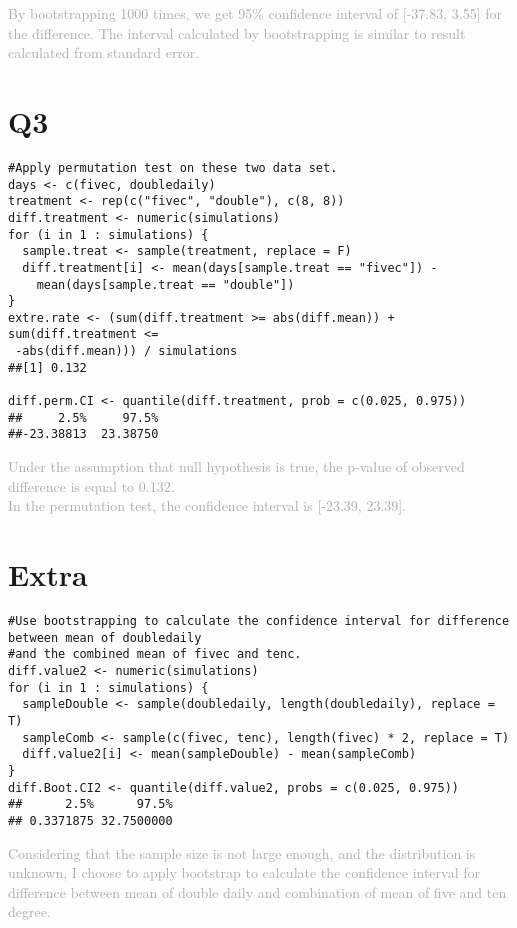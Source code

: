 \documentclass[12pt]{article}
\begin{document}
\noindent \textcolor{darkgray}{By bootstrapping 1000 times, we get 95$\%$ confidence interval of [-37.83, 3.55] for the difference. The interval calculated by bootstrapping is similar to result calculated from standard error.}

\section*{Q3}
\begin{verbatim}
#Apply permutation test on these two data set.
days <- c(fivec, doubledaily)
treatment <- rep(c("fivec", "double"), c(8, 8))
diff.treatment <- numeric(simulations) 
for (i in 1 : simulations) {
  sample.treat <- sample(treatment, replace = F)
  diff.treatment[i] <- mean(days[sample.treat == "fivec"]) - 
  	mean(days[sample.treat == "double"])
}
extre.rate <- (sum(diff.treatment >= abs(diff.mean)) + sum(diff.treatment <=
 -abs(diff.mean))) / simulations
##[1] 0.132

diff.perm.CI <- quantile(diff.treatment, prob = c(0.025, 0.975))
##     2.5%     97.5% 
##-23.38813  23.38750 
\end{verbatim}

\noindent \textcolor{darkgray}{Under the assumption that null hypothesis is true, the p-value of observed difference is equal to 0.132. \\
In the permutation test, the confidence interval is [-23.39, 23.39].}

\section*{Extra}
\begin{verbatim}
#Use bootstrapping to calculate the confidence interval for difference between mean of doubledaily
#and the combined mean of fivec and tenc.
diff.value2 <- numeric(simulations)
for (i in 1 : simulations) {
  sampleDouble <- sample(doubledaily, length(doubledaily), replace = T)
  sampleComb <- sample(c(fivec, tenc), length(fivec) * 2, replace = T)
  diff.value2[i] <- mean(sampleDouble) - mean(sampleComb)
}
diff.Boot.CI2 <- quantile(diff.value2, probs = c(0.025, 0.975))
##      2.5%      97.5% 
## 0.3371875 32.7500000 
\end{verbatim}

\noindent \textcolor{darkgray}{Considering that the sample size is not large enough, and the distribution is unknown, I choose to apply bootstrap to calculate the confidence interval for difference between mean of double daily and combination of mean of five and ten degree.}
\end{document}
